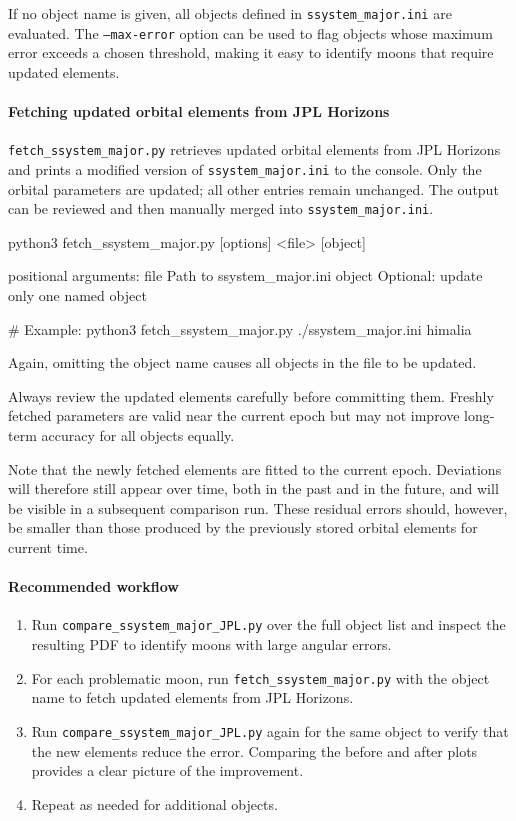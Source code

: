 If no object name is given, all objects defined in \texttt{ssystem\_major.ini} are
evaluated. The \texttt{--max-error} option can be used to flag objects whose maximum
error exceeds a chosen threshold, making it easy to identify moons that require updated
elements.

\paragraph{Fetching updated orbital elements from JPL Horizons}

\texttt{fetch\_ssystem\_major.py} retrieves updated orbital elements from JPL Horizons
and prints a modified version of \texttt{ssystem\_major.ini} to the console. Only the
orbital parameters are updated; all other entries remain unchanged. The output can be
reviewed and then manually merged into \texttt{ssystem\_major.ini}.

\begin{commands}
python3 fetch_ssystem_major.py [options] <file> [object]

positional arguments:
  file        Path to ssystem_major.ini
  object      Optional: update only one named object

# Example:
python3 fetch_ssystem_major.py ./ssystem_major.ini himalia
\end{commands}

Again, omitting the object name causes all objects in the file to be updated.

Always review the updated elements carefully before committing them. Freshly fetched
parameters are valid near the current epoch but may not improve long-term accuracy for
all objects equally.

Note that the newly fetched elements are fitted to the current epoch. Deviations will
therefore still appear over time, both in the past and in the future, and will be visible
in a subsequent comparison run. These residual errors should, however, be smaller than
those produced by the previously stored orbital elements for current time.

\paragraph{Recommended workflow}

\begin{enumerate}
  \item Run \texttt{compare\_ssystem\_major\_JPL.py} over the full object list and inspect
        the resulting PDF to identify moons with large angular errors.
  \item For each problematic moon, run \texttt{fetch\_ssystem\_major.py} with the object
        name to fetch updated elements from JPL Horizons.
  \item Run \texttt{compare\_ssystem\_major\_JPL.py} again for the same object to verify
        that the new elements reduce the error. Comparing the before and after plots
        provides a clear picture of the improvement.
  \item Repeat as needed for additional objects.
\end{enumerate}


